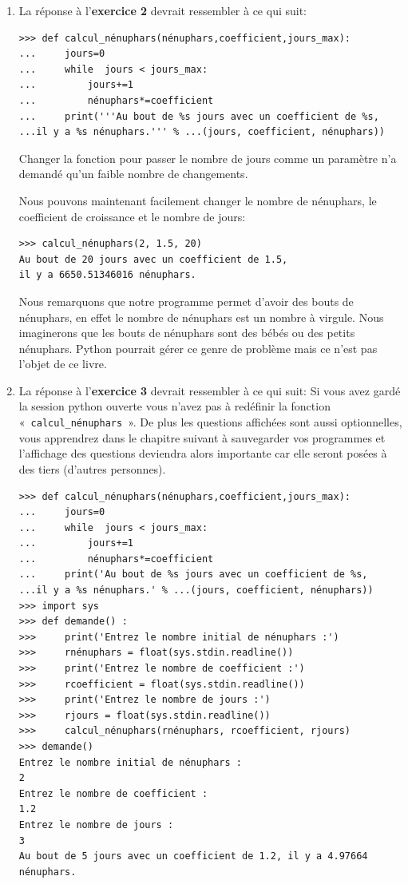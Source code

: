 \begin{enumerate}
\item La réponse à l'\textbf{exercice 2} devrait ressembler à ce qui suit: 
\begin{Verbatim}[frame=single,rulecolor=\color{mbleu}, label=à taper]
>>> def calcul_nénuphars(nénuphars,coefficient,jours_max):
...     jours=0
...     while  jours < jours_max:
...         jours+=1
...         nénuphars*=coefficient
...     print('''Au bout de %s jours avec un coefficient de %s, 
...il y a %s nénuphars.''' % ...(jours, coefficient, nénuphars))
\end{Verbatim}
Changer la fonction pour passer le nombre de jours comme un paramètre n'a demandé qu'un faible nombre de changements.

Nous pouvons maintenant facilement changer le nombre de nénuphars, le coefficient de croissance et le nombre de jours:

\begin{Verbatim}[frame=single,rulecolor=\color{mbleu}, label=à taper]
>>> calcul_nénuphars(2, 1.5, 20)
Au bout de 20 jours avec un coefficient de 1.5, 
il y a 6650.51346016 nénuphars.
\end{Verbatim}
Nous remarquons que notre programme permet d'avoir des bouts de nénuphars, en effet le nombre de nénuphars est un nombre à virgule. Nous imaginerons que les bouts de nénuphars sont des bébés ou des petits nénuphars. Python pourrait gérer ce genre de problème mais ce n'est pas l'objet de ce livre.

\item La réponse à l'\textbf{exercice 3} devrait ressembler à ce qui suit: 
Si vous avez gardé la session python ouverte vous n'avez pas à redéfinir la fonction « \texttt{calcul\_nénuphars} ». De plus les questions affichées sont aussi optionnelles, vous apprendrez dans le chapitre suivant à sauvegarder vos programmes et l'affichage des questions deviendra alors importante car elle seront posées à des tiers (d'autres personnes).

\begin{Verbatim}[frame=single,rulecolor=\color{mbleu}, label=à taper]
>>> def calcul_nénuphars(nénuphars,coefficient,jours_max):
...     jours=0
...     while  jours < jours_max:
...         jours+=1
...         nénuphars*=coefficient
...     print('Au bout de %s jours avec un coefficient de %s, 
...il y a %s nénuphars.' % ...(jours, coefficient, nénuphars))
>>> import sys
>>> def demande() : 
>>>     print('Entrez le nombre initial de nénuphars :')
>>>     rnénuphars = float(sys.stdin.readline())
>>>     print('Entrez le nombre de coefficient :')
>>>     rcoefficient = float(sys.stdin.readline())
>>>     print('Entrez le nombre de jours :')
>>>     rjours = float(sys.stdin.readline())
>>>     calcul_nénuphars(rnénuphars, rcoefficient, rjours)
>>> demande()
Entrez le nombre initial de nénuphars :
2
Entrez le nombre de coefficient :
1.2
Entrez le nombre de jours :
3
Au bout de 5 jours avec un coefficient de 1.2, il y a 4.97664 nénuphars.\end{Verbatim}
\end{enumerate}

